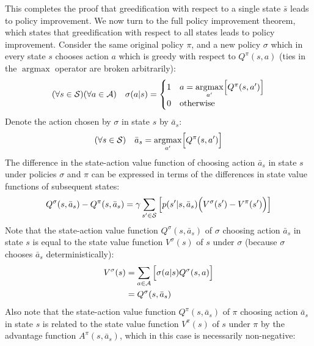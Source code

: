 This completes the proof that greedification with respect to a single state $\bar{s}$ leads to policy improvement. We now turn to the full policy improvement theorem, which states that greedification with respect to all states leads to policy improvement. Consider the same original policy $\pi$, and a new policy $\sigma$ which in every state $s$ chooses action $a$ which is greedy with respect to $Q^\pi(s, a)$ (ties in the $\operatorname{argmax}$ operator are broken arbitrarily):
\begin{equation*}
    (\forall s\in\mathcal{S})(\forall a\in\mathcal{A})\quad\sigma(a\vert s) = \begin{cases}
        1 & a = \underset{a'}{\operatorname{argmax}}\Bigl[ Q^\pi(s, a') \Bigr] \\
        0 & \text{otherwise}
    \end{cases}
\end{equation*}
Denote the action chosen by $\sigma$ in state $s$ by $\bar{a}_s$:
\begin{equation*}
    (\forall s\in\mathcal{S})\quad \bar{a}_s = \underset{a'}{\operatorname{argmax}}\Bigl[ Q^\pi(s, a') \Bigr]
\end{equation*}
The difference in the state-action value function of choosing action $\bar{a}_s$ in state $s$ under policies $\sigma$ and $\pi$ can be expressed in terms of the differences in state value functions of subsequent states:
\begin{equation*}
    Q^\sigma(s, \bar{a}_s) - Q^\pi(s, \bar{a}_s) = \gamma\sum_{s'\in\mathcal{S}}{\left[ p(s'\vert s, \bar{a}_s) \Bigl( V^\sigma(s') - V^\pi(s')\Bigr) \right]}
\end{equation*}
Note that the state-action value function $Q^\sigma(s, \bar{a}_s)$ of $\sigma$ choosing action $\bar{a}_s$ in state $s$ is equal to the state value function $V^\sigma(s)$ of $s$ under $\sigma$ (because $\sigma$ chooses $\bar{a}_s$ deterministically):
\begin{align*}
    V^\sigma(s) &= \sum_{a\in\mathcal{A}}{\Bigl[ \sigma(a\vert s) Q^\sigma(s, a) \Bigr]} \\
    &= Q^\sigma(s, \bar{a}_s)
\end{align*}
Also note that the state-action value function $Q^\pi(s, \bar{a}_s)$ of $\pi$ choosing action $\bar{a}_s$ in state $s$ is related to the state value function $V^\pi(s)$ of $s$ under $\pi$ by the advantage function $A^\pi(s, \bar{a}_s)$, which in this case is necessarily non-negative:
